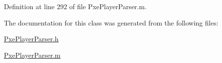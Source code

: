 Definition at line 292 of file Pxe\-Player\-Parser.\-m.



The documentation for this class was generated from the following files\-:\begin{DoxyCompactItemize}
\item 
\hyperlink{_pxe_player_parser_8h}{Pxe\-Player\-Parser.\-h}\item 
\hyperlink{_pxe_player_parser_8m}{Pxe\-Player\-Parser.\-m}\end{DoxyCompactItemize}
